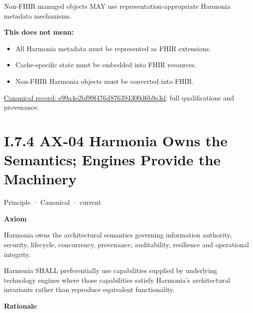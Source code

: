Non-FHIR managed objects MAY use representation-appropriate Harmonia
metadata mechanisms.



\textbf{This does not mean:}



\begin{itemize}


\item All Harmonia metadata must be represented as FHIR extensions.

\item Cache-specific state must be embedded into FHIR resources.

\item Non-FHIR Harmonia objects must be converted into FHIR.

\end{itemize}

{\footnotesize \href{../../../../continuum/motivation/principle/e99a4e2bf99f476d876394300d6b9c3d.md}{Canonical record: e99a4e2bf99f476d876394300d6b9c3d}; full qualifications and provenance.}\par
\section*{I.7.4 AX-04 Harmonia Owns the Semantics; Engines Provide the Machinery}
\label{navigation:I.7.4}

\label{element:54508cda80484a6caf95b901780eaf7d}
{\small Principle · Canonical · current}\par

\par\medskip\textbf{Axiom}\par


Harmonia owns the architectural semantics governing information
authority, security, lifecycle, concurrency, provenance, auditability,
resilience and operational integrity.



Harmonia SHALL preferentially use capabilities supplied by underlying
technology engines where those capabilities satisfy Harmonia's
architectural invariants rather than reproduce equivalent functionality.



\par\medskip\textbf{Rationale}\par


